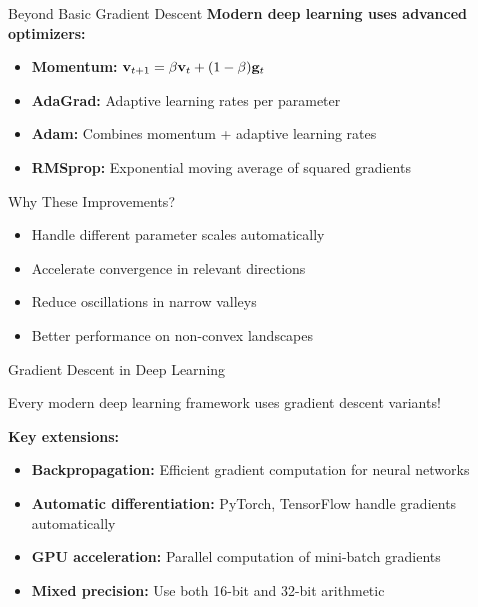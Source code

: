 \documentclass[usenames,dvipsnames]{beamer}
\begin{document}
  \begin{frame}{Beyond Basic Gradient Descent}
    \textbf{Modern deep learning uses advanced optimizers:}
    
    \begin{itemize}[<+->]
        \item \textbf{Momentum:} $\mathbf{v}_{t+1} = \beta \mathbf{v}_t + (1-\beta)\mathbf{g}_t$
        \item \textbf{AdaGrad:} Adaptive learning rates per parameter
        \item \textbf{Adam:} Combines momentum + adaptive learning rates  
        \item \textbf{RMSprop:} Exponential moving average of squared gradients
    \end{itemize}
    
    \pause
    \begin{examplebox}{Why These Improvements?}
    \begin{itemize}
        \item Handle different parameter scales automatically
        \item Accelerate convergence in relevant directions
        \item Reduce oscillations in narrow valleys
        \item Better performance on non-convex landscapes
    \end{itemize}
    \end{examplebox}
  \end{frame}

  \begin{frame}{Gradient Descent in Deep Learning}
    \begin{keypointsbox}
    Every modern deep learning framework uses gradient descent variants!
    \end{keypointsbox}
    
    \pause
    \textbf{Key extensions:}
    \begin{itemize}[<+->]
        \item \textbf{Backpropagation:} Efficient gradient computation for neural networks
        \item \textbf{Automatic differentiation:} PyTorch, TensorFlow handle gradients automatically
        \item \textbf{GPU acceleration:} Parallel computation of mini-batch gradients
        \item \textbf{Mixed precision:} Use both 16-bit and 32-bit arithmetic
    \end{itemize}
  \end{frame}
\end{document}
